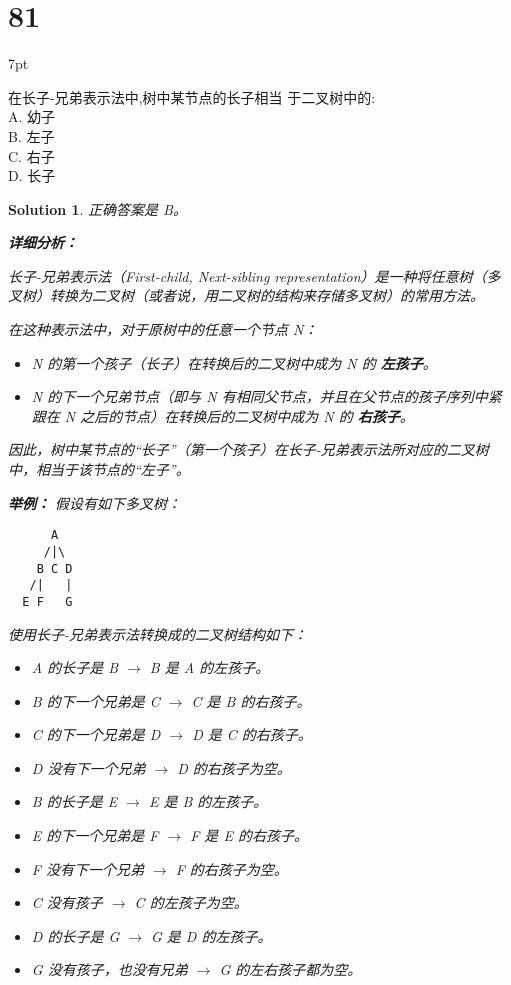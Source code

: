 \documentclass[UTF8]{report}
\newtheorem{solution}{Solution}
\theoremstyle{MyLineTheoremStyle} %
\theoremstyle{MyBlockTheoremStyle} %
\theoremstyle{MySubsubsectionStyle} %
\newenvironment{graybox}{%
        \def\FrameCommand{%
        \hspace{1pt}%
        {\color{gray}\small \vrule width 2pt}%
        {\color{graybox_color}\vrule width 4pt}%
        \colorbox{graybox_color}%
        }%
        \MakeFramed{\advance\hsize-\width\FrameRestore}%
        \noindent\hspace{-4.55pt}%
        \begin{adjustwidth}{}{7pt}%
        \vspace{2pt}\vspace{2pt}%
        }
        {%
        \vspace{2pt}\end{adjustwidth}\endMakeFramed%
        }
\begin{document}
\section*{81}
\begin{graybox}
在长子-兄弟表示法中,树中某节点的长子相当
于二叉树中的: \\
A. 幼子 \\
B. 左子 \\
C. 右子 \\
D. 长子
\end{graybox}

\begin{solution}
正确答案是 B。

\textbf{详细分析：}

长子-兄弟表示法（First-child, Next-sibling representation）是一种将任意树（多叉树）转换为二叉树（或者说，用二叉树的结构来存储多叉树）的常用方法。

在这种表示法中，对于原树中的任意一个节点 N：
\begin{itemize}
    \item N 的第一个孩子（长子）在转换后的二叉树中成为 N 的 \textbf{左孩子}。
    \item N 的下一个兄弟节点（即与 N 有相同父节点，并且在父节点的孩子序列中紧跟在 N 之后的节点）在转换后的二叉树中成为 N 的 \textbf{右孩子}。
\end{itemize}

因此，树中某节点的“长子”（第一个孩子）在长子-兄弟表示法所对应的二叉树中，相当于该节点的“左子”。

\textbf{举例：}
假设有如下多叉树：
\begin{verbatim}
      A
     /|\
    B C D
   /|   |
  E F   G
\end{verbatim}

使用长子-兄弟表示法转换成的二叉树结构如下：
\begin{itemize}
    \item A 的长子是 B $\rightarrow$ B 是 A 的左孩子。
    \item B 的下一个兄弟是 C $\rightarrow$ C 是 B 的右孩子。
    \item C 的下一个兄弟是 D $\rightarrow$ D 是 C 的右孩子。
    \item D 没有下一个兄弟 $\rightarrow$ D 的右孩子为空。
    \item B 的长子是 E $\rightarrow$ E 是 B 的左孩子。
    \item E 的下一个兄弟是 F $\rightarrow$ F 是 E 的右孩子。
    \item F 没有下一个兄弟 $\rightarrow$ F 的右孩子为空。
    \item C 没有孩子 $\rightarrow$ C 的左孩子为空。
    \item D 的长子是 G $\rightarrow$ G 是 D 的左孩子。
    \item G 没有孩子，也没有兄弟 $\rightarrow$ G 的左右孩子都为空。
\end{itemize}


\end{solution}
\end{document}

